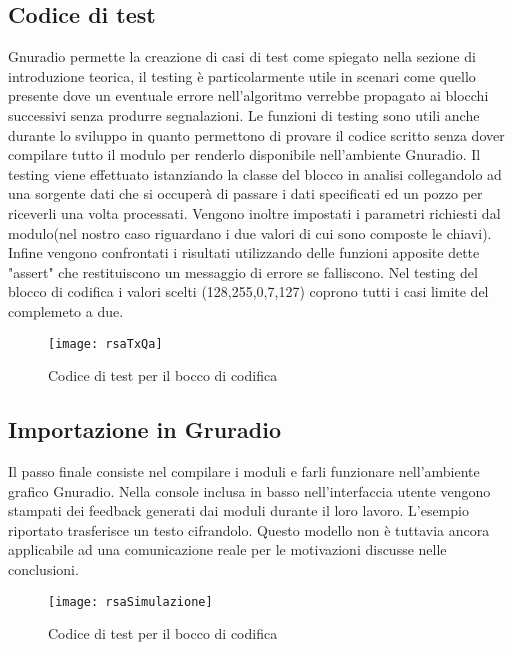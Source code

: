 \subsection{Codice di test}
Gnuradio permette la creazione di casi di test come spiegato nella sezione di introduzione teorica, il testing è particolarmente utile in scenari come quello presente dove un eventuale errore nell'algoritmo verrebbe propagato ai blocchi successivi senza produrre segnalazioni. Le funzioni di testing sono utili anche durante lo sviluppo in quanto permettono di provare il codice scritto senza dover compilare tutto il modulo per renderlo disponibile nell'ambiente Gnuradio. Il testing viene effettuato istanziando la classe del blocco in analisi collegandolo ad una sorgente dati che si occuperà di passare i dati specificati ed un pozzo per riceverli una volta processati. Vengono inoltre impostati i parametri richiesti dal modulo(nel nostro caso riguardano i due valori di cui sono composte le chiavi). Infine vengono confrontati i risultati utilizzando delle funzioni apposite dette "assert" che restituiscono un messaggio di errore se falliscono.
Nel testing del blocco di codifica i valori scelti (128,255,0,7,127) coprono tutti i casi limite del complemeto a due.
\begin{figure}[h]
	\centering
	\texttt{[image: rsaTxQa]}
	\caption{Codice di test per il bocco di codifica}
\end{figure}
\subsection{Importazione in Gruradio}
Il passo finale consiste nel compilare i moduli e farli funzionare nell'ambiente grafico Gnuradio. Nella console inclusa in basso nell'interfaccia utente vengono stampati dei feedback generati dai moduli durante il loro lavoro. L'esempio riportato trasferisce un testo cifrandolo. Questo modello non è tuttavia ancora applicabile ad una comunicazione reale per le motivazioni discusse nelle conclusioni.
\begin{figure}[h]
	\centering
	\texttt{[image: rsaSimulazione]}
	\caption{Codice di test per il bocco di codifica}
\end{figure}

\newpage
